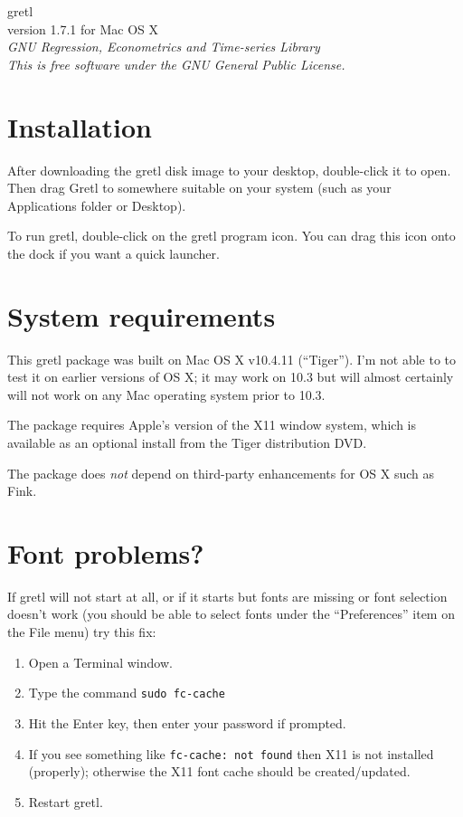 \documentclass[11pt]{article}
\begin{document}
\begin{center}
{\color{gold} \titlefont gretl} \\[1ex]
version 1.7.1 for Mac OS X \\[2ex]

\textit{GNU Regression, Econometrics and Time-series Library\\
  This is free software under the GNU General Public License.}

\end{center}

\section{Installation}
\label{sec:install}

After downloading the gretl disk image to your desktop, double-click
it to open. Then drag \textsf{Gretl} to somewhere suitable on your
system (such as your \textsf{Applications} folder or Desktop).

To run gretl, double-click on the gretl program icon.  You can drag
this icon onto the dock if you want a quick launcher.

\section{System requirements}
\label{sec:os}

This gretl package was built on Mac OS X v10.4.11 (``Tiger'').  I'm not
able to to test it on earlier versions of OS X; it may work on 10.3
but will almost certainly will not work on any Mac operating system
prior to 10.3.

The package requires Apple's version of the X11 window system, which
is available as an optional install from the Tiger distribution DVD.

The package does \textit{not} depend on third-party enhancements for
OS X such as \textsf{Fink}.

\section{Font problems?}
\label{sec:fonts}

If gretl will not start at all, or if it starts but fonts are missing
or font selection doesn't work (you should be able to select fonts
under the ``Preferences'' item on the File menu) try this fix:

\begin{enumerate}
\item Open a Terminal window.
\item Type the command \texttt{sudo fc-cache}
\item Hit the Enter key, then enter your password if prompted.
\item If you see something like \texttt{fc-cache: not found} then
   X11 is not installed (properly); otherwise the X11 font cache
   should be created/updated.
\item Restart gretl.
\end{enumerate}
\end{document}

